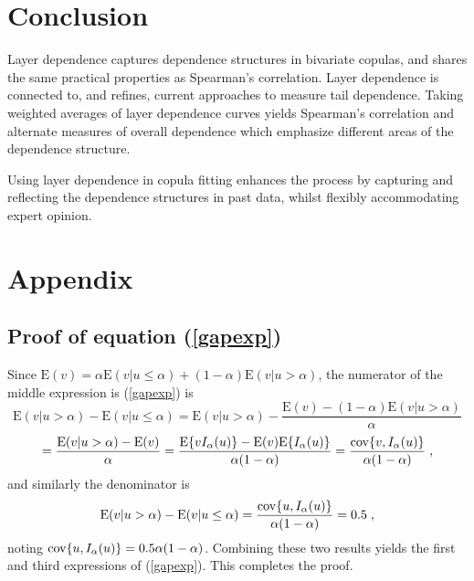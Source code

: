 \documentclass[authoryear]{elsarticle}
\newcommand{\cov}{{\rm cov}}
\newcommand{\E}{{\mathrm E}}
\newcommand{\eref}[1]{(\ref{#1})}
\begin{document}
\section{Conclusion}\label{sconclusion}

Layer dependence captures dependence structures in bivariate copulas, and shares the same practical properties as Spearman's correlation. Layer dependence is connected to, and refines, current approaches to measure tail dependence. Taking weighted averages of layer dependence curves yields Spearman's correlation and alternate measures of overall dependence which emphasize different areas of the dependence structure.

Using layer dependence in copula fitting enhances the process by capturing and reflecting the dependence structures in past data, whilst flexibly accommodating expert opinion.

\newpage

\newpage

\section{Appendix}


\subsection{Proof of equation \eref{gapexp}}

Since $\E(v)=\alpha\E(v|u\le\alpha)+(1-\alpha)\E(v|u>\alpha)$, the numerator of the middle expression is \eref{gapexp} is
$$
\E(v|u>\alpha)-\E(v|u\leq \alpha) = \E(v|u>\alpha)- \frac{\E(v)-(1-\alpha)\E(v|u>\alpha)}{\alpha}
$$
$$
= \frac{\E(v|u>\alpha)-\E(v)}{\alpha}
= \frac{\E\{vI_\alpha(u)\}-\E(v)\E\{I_\alpha(u)\}}{\alpha(1-\alpha)}
= \frac{\cov\{v,I_\alpha(u)\}}{\alpha(1-\alpha)} \;,
$$
and similarly the denominator is
$$
\E(v|u>\alpha)-\E(v|u\leq \alpha) = \frac{\cov\{u,I_\alpha(u)\}}{\alpha(1-\alpha)} = 0.5 \;,
$$
noting $\cov\{u,I_\alpha(u)\}=0.5\alpha(1-\alpha)$. Combining these two results yields the first and third expressions of \eref{gapexp}. This completes the proof.
\end{document}
